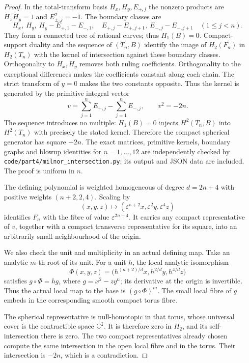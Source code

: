 \begin{proof}
In the total-transform basis $H_x,H_y,E_{\pm,j}$ the nonzero
products are $H_xH_y=1$ and $E_{\pm,j}^2=-1$. The boundary
classes are
\[
 H_x,\ H_y,\ H_y-E_{+,1}-E_{-,1},\quad
 E_{+,j}-E_{+,j+1},\ E_{-,j}-E_{-,j+1}\quad(1\leq j<n).
\]
They form a connected tree of rational curves; thus $H_1(B)=0$.
Compact-support duality and the sequence of $(T_n,B)$ identify
the image of $H_2(F_n)$ in $H_2(T_n)$ with the kernel of
intersection against these boundary classes. Orthogonality to
$H_x,H_y$ removes both ruling coefficients. Orthogonality to
the exceptional differences makes the coefficients constant
along each chain. The strict transform of $y=0$ makes the two
constants opposite. Thus the kernel is generated by the
primitive integral vector
\[
 v=\sum_{j=1}^n E_{+,j}-\sum_{j=1}^n E_{-,j},\qquad v^2=-2n.
\]
The sequence introduces no multiple: $H_1(B)=0$ injects
$H^2(T_n,B)$ into $H^2(T_n)$ with precisely the stated kernel.
Therefore the compact spherical generator has square $-2n$.
The exact matrices, primitive kernels, boundary graphs and
blowup identities for $n=1,\ldots,12$ are independently checked
by \texttt{code/part4/milnor\_intersection.py}; its output and
JSON data are included. The proof is uniform in $n$.

The defining polynomial is weighted homogeneous of degree
$d=2n+4$ with positive weights $(n+2,2,4)$. Scaling by
\[
 (x,y,z)\longmapsto
 (\varepsilon^{n+2}x,\varepsilon^2y,\varepsilon^4z)
\]
identifies $F_n$ with the fibre of value $\varepsilon^{2n+4}$.
It carries any compact representative of $v$, together with a
compact transverse representative for its square, into an
arbitrarily small neighbourhood of the origin.

We also check the unit and multiplicity in an actual defining
map. Take an analytic $m$-th root of its unit. For a unit $h$,
the local analytic isomorphism
\[
 \Phi(x,y,z)=
 \bigl(h^{(n+2)/d}x,h^{2/d}y,h^{4/d}z\bigr)
\]
satisfies $g\circ\Phi=hg$, where $g=x^2-zy^n$; its derivative
at the origin is invertible. Thus the actual local map to the
base is $(g\circ\Phi)^m$. The small local fibre of $g$ embeds
in the corresponding smooth compact torus fibre.

The spherical representative is null-homotopic in that torus,
whose universal cover is the contractible space $\mathbb C^2$.
It is therefore zero in $H_2$, and its self-intersection there
is zero. The two compact representatives already chosen compute
the same intersection in the open local fibre and in the torus.
Their intersection is $-2n$, which is a contradiction.
\end{proof}

